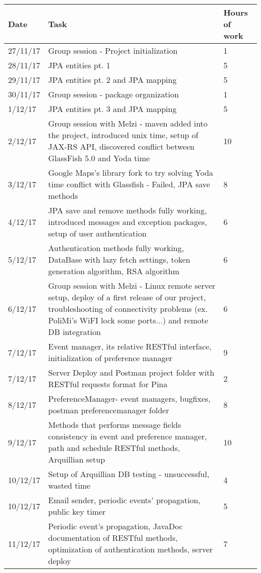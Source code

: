 \begin{longtable}{ p{2cm} p{10cm} p{3cm}}
	Date & Task & Hours of work\\
	\hline
	27/11/17 & Group session - Project initialization & 1 \\
	28/11/17 & JPA entities pt. 1 & 5 \\
	29/11/17 & JPA entities pt. 2 and JPA mapping & 5 \\
	30/11/17 & Group session - package organization & 1 \\
	1/12/17 & JPA entities pt. 3 and JPA mapping & 5 \\
	2/12/17 & Group session with Melzi - maven added into the project, introduced unix time, setup of JAX-RS API, discovered conflict between GlassFish 5.0 and Yoda time & 10 \\
	3/12/17 & Google Maps's library fork to try solving Yoda time conflict with Glassfish - Failed, JPA save methods & 8 \\
	4/12/17 & JPA save and remove methods fully working, introduced messages and exception packages, setup of user authentication & 6 \\
	5/12/17 & Authentication methods fully working, DataBase with lazy fetch settings, token generation algorithm, RSA algorithm & 6 \\
	6/12/17 & Group session with Melzi - Linux remote server setup, deploy of a first release of our project, troubleshooting of connectivity problems (ex. PoliMi's WiFI lock some ports...) and remote DB integration & 6 \\
	7/12/17 & Event manager, its relative RESTful interface, initialization of preference manager & 9 \\
	7/12/17 & Server Deploy and Postman project folder with RESTful requests format for Pina & 2 \\
	8/12/17 & PreferenceManager- event managers, bugfixes, postman preferencemanager folder & 8 \\
	9/12/17 & Methods that performs message fields consistency in event and preference manager, path and schedule RESTful methods, Arquillian setup & 10 \\
	10/12/17 & Setup of Arquillian DB testing - unsuccessful, wasted time & 4 \\
	10/12/17 & Email sender, periodic events' propagation, public key timer & 5 \\
	11/12/17 & Periodic event's propagation, JavaDoc documentation of RESTful methods, optimization of authentication methods, server deploy & 7 \\

\end{longtable}
